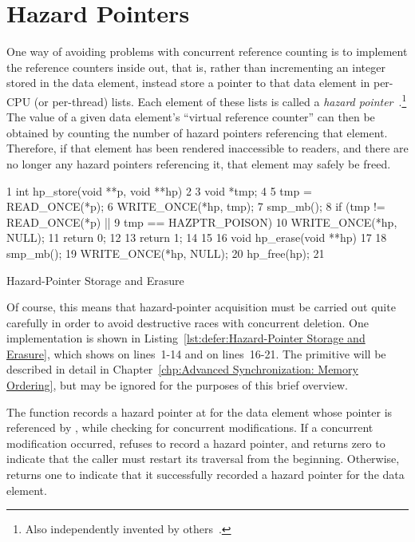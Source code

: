 
\section{Hazard Pointers}
\label{sec:defer:Hazard Pointers}

One way of avoiding problems with concurrent reference counting
is to implement the reference counters
inside out, that is, rather than incrementing an integer stored in the
data element, instead store a pointer to that data element in
per-CPU (or per-thread) lists.
Each element of these lists is called a
\emph{hazard pointer}~\cite{MagedMichael04a}.\footnote{
	Also independently invented by others~\cite{HerlihyLM02}.}
The value of a given data element's ``virtual reference counter'' can
then be obtained by counting the number of hazard pointers referencing
that element.
Therefore, if that element has been rendered inaccessible to readers,
and there are no longer any hazard pointers referencing it, that element
may safely be freed.

\begin{listing}[btp]
{ \scriptsize
\begin{verbbox}
 1 int hp_store(void **p, void **hp)
 2 {
 3   void *tmp;
 4 
 5   tmp = READ_ONCE(*p);
 6   WRITE_ONCE(*hp, tmp);
 7   smp_mb();
 8   if (tmp != READ_ONCE(*p) ||
 9       tmp == HAZPTR_POISON) {
10     WRITE_ONCE(*hp, NULL);
11     return 0;
12   }
13   return 1;
14 }
15 
16 void hp_erase(void **hp)
17 {
18   smp_mb();
19   WRITE_ONCE(*hp, NULL);
20   hp_free(hp);
21 }
\end{verbbox}
}
\centering
\theverbbox
\caption{Hazard-Pointer Storage and Erasure}
\label{lst:defer:Hazard-Pointer Storage and Erasure}
\end{listing}

Of course, this means that hazard-pointer acquisition must be carried
out quite carefully in order to avoid destructive races with concurrent
deletion.
One implementation is shown in
Listing~\ref{lst:defer:Hazard-Pointer Storage and Erasure},
which shows  on lines~1-14 and  on
lines~16-21.
The  primitive will be described in detail in
Chapter~\ref{chp:Advanced Synchronization: Memory Ordering}, but may be ignored for
the purposes of this brief overview.

The  function records a hazard pointer at  for the data
element whose pointer is referenced by , while checking for
concurrent modifications.
If a concurrent modification occurred,  refuses to record
a hazard pointer, and returns zero to indicate that the caller must
restart its traversal from the beginning.
Otherwise,  returns one to indicate that it successfully
recorded a hazard pointer for the data element.

